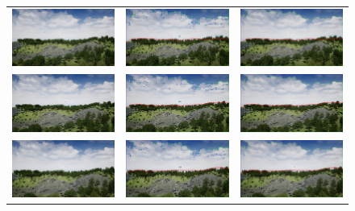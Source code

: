 \begin{figure}
\begin{tabular}{ccc}
    \includegraphics[width=.27\linewidth]{images/airsim_thresh/img_6.jpg} &
    \includegraphics[width=.27\linewidth]{images/airsim_thresh/img_adaptive_6.jpg} &
    \includegraphics[width=.27\linewidth]{images/airsim_thresh/img_thresh_6.jpg} \\
    
    \includegraphics[width=.27\linewidth]{images/airsim_thresh/img_7.jpg} &
    \includegraphics[width=.27\linewidth]{images/airsim_thresh/img_adaptive_7.jpg} &
    \includegraphics[width=.27\linewidth]{images/airsim_thresh/img_thresh_7.jpg} \\
    
    \includegraphics[width=.27\linewidth]{images/airsim_thresh/img_8.jpg} &
    \includegraphics[width=.27\linewidth]{images/airsim_thresh/img_adaptive_8.jpg} &
    \includegraphics[width=.27\linewidth]{images/airsim_thresh/img_thresh_8.jpg} \\
    

\end{tabular}
\end{figure}
